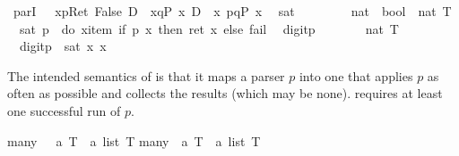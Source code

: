 \begin{isabellebody}
\isamarkupfalse%
\isamarkupfalse%
\isamarkupfalse%
\isamarkupfalse%
\isamarkupfalse%
\isamarkupfalse%
\isamarkupfalse%
\isamarkupfalse%
\isamarkupfalse%
\isanewline
\isanewline
\isamarkupfalse%
\ parI{}{\isacharcolon}\ {\isachardoublequote}{\isasymturnstile}\ {\isacharbrackleft}{\isacharhash}\ x{\isasymleftarrow}p{\isacharbrackright}{\isacharparenleft}Ret\ False{\isacharparenright}\ {\isasymand}\isactrlsub D\ {\isacharbrackleft}{\isacharhash}\ x{\isasymleftarrow}q{\isacharbrackright}{\isacharparenleft}P\ x{\isacharparenright}\ {\isasymlongrightarrow}\isactrlsub D\ {\isacharbrackleft}{\isacharhash}\ x{\isasymleftarrow}\ p{\isasymparallel}q{\isacharbrackright}{\isacharparenleft}P\ x{\isacharparenright}{\isachardoublequote}\isamarkupfalse%
\isamarkupfalse%
\isamarkupfalse%
\isamarkupfalse%
\isamarkupfalse%
\isamarkupfalse%
\isamarkupfalse%
\isamarkupfalse%
\isamarkupfalse%
\isamarkupfalse%
\isamarkupfalse%
%
\isamarkuptrue%
%
\label{isa:defined-parsers}
\isanewline
\ \ sat\ \ \ \ \ \ \ \ {\isacharcolon}{\isacharcolon}\ {\isachardoublequote}{\isacharparenleft}nat\ {\isasymRightarrow}\ bool{\isacharparenright}\ {\isasymRightarrow}\ nat\ T{\isachardoublequote}\isanewline
\ \ {\isachardoublequote}sat\ p\ {\isasymequiv}\ do\ {\isacharbraceleft}x{\isasymleftarrow}item{\isacharsemicolon}\ if\ p\ x\ then\ ret\ x\ else\ fail{\isacharbraceright}{\isachardoublequote}\isanewline
\ \ digitp\ \ \ \ \ \ \ {\isacharcolon}{\isacharcolon}\ {\isachardoublequote}nat\ T{\isachardoublequote}\isanewline
\ \ {\isachardoublequote}digitp\ {\isasymequiv}\ sat\ {\isacharparenleft}{\isasymlambda}x{\isachardot}\ x\ {\isacharless}\ {}{}{\isacharparenright}{\isachardoublequote}\isamarkupfalse%
%
\begin{isamarkuptext}%
The intended semantics of  is that it maps a parser $p$ into one
  that applies $p$ as often as possible and collects the results (which may be 
  none).  requires at least one successful run of $p$.%
\end{isamarkuptext}%
\isamarkuptrue%
\isanewline
many\ \ {\isacharcolon}{\isacharcolon}\ {\isachardoublequote}{\isacharprime}a\ T\ {\isasymRightarrow}\ {\isacharprime}a\ list\ T{\isachardoublequote}\isanewline
many{}\ {\isacharcolon}{\isacharcolon}\ {\isachardoublequote}{\isacharprime}a\ T\ {\isasymRightarrow}\ {\isacharprime}a\ list\ T{\isachardoublequote}\isamarkupfalse%
%
\begin{isamarkuptext}%

\end{isamarkuptext}
\end{isabellebody}
